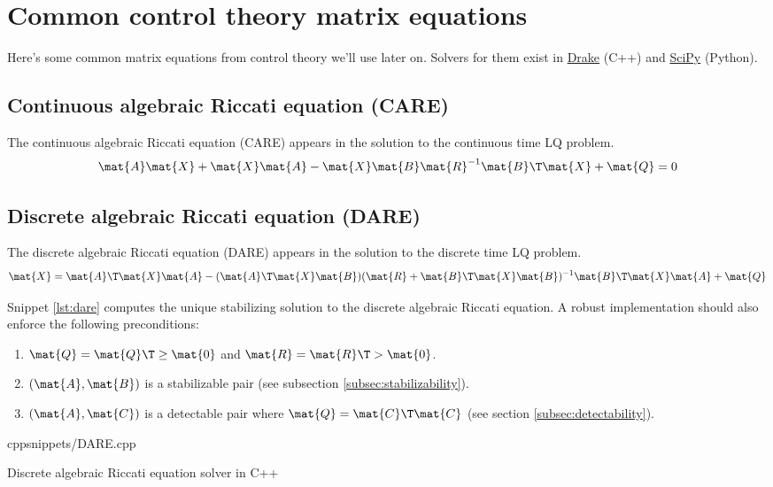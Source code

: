 \section{Common control theory matrix equations}

Here's some common matrix equations from control theory we'll use later on.
Solvers for them exist in \href{https://github.com/RobotLocomotion/drake}{Drake}
(C++) and \href{https://github.com/scipy/scipy}{SciPy} (Python).

\subsection{Continuous algebraic Riccati equation (CARE)}

The continuous algebraic Riccati equation (CARE) appears in the solution to the
continuous time LQ problem.
\begin{equation}
  \mat{A}\mat{X} + \mat{X}\mat{A} - \mat{X}\mat{B}\mat{R}^{-1}\mat{B}\T\mat{X} +
    \mat{Q} = 0
\end{equation}

\subsection{Discrete algebraic Riccati equation (DARE)}
\label{subsec:dare}

The discrete algebraic Riccati equation (DARE) appears in the solution to the
discrete time LQ problem.
\begin{equation}
  \mat{X} = \mat{A}\T\mat{X}\mat{A} - (\mat{A}\T\mat{X}\mat{B})(\mat{R} +
    \mat{B}\T\mat{X}\mat{B})^{-1} \mat{B}\T\mat{X}\mat{A} + \mat{Q}
\end{equation}

Snippet \ref{lst:dare} computes the unique stabilizing solution to the discrete
algebraic Riccati equation. A robust implementation should also enforce the
following preconditions:
\begin{enumerate}
  \item $\mat{Q} = \mat{Q}\T \geq \mat{0}$ and $\mat{R} = \mat{R}\T > \mat{0}$.
  \item $(\mat{A}, \mat{B})$ is a stabilizable pair (see subsection
    \ref{subsec:stabilizability}).
  \item $(\mat{A}, \mat{C})$ is a detectable pair where
    $\mat{Q} = \mat{C}\T\mat{C}$ (see section \ref{subsec:detectability}).
\end{enumerate}
\begin{coderemote}{cpp}{snippets/DARE.cpp}
  \caption{Discrete algebraic Riccati equation solver in C++}
  \label{lst:dare}
\end{coderemote}

